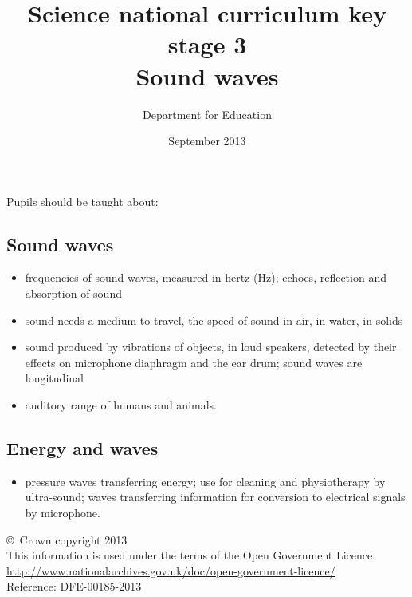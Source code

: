 \documentclass[a4paper,12pt]{article}
\begin{document}
\setcounter{secnumdepth}{0}

\title{Science national curriculum key stage 3\\Sound waves}
\author{Department for Education}
\date{September 2013}
\maketitle

\thispagestyle{empty}

Pupils should be taught about:

\subsection{Sound waves}
\begin{itemize}
\item frequencies of sound waves, measured in hertz (Hz); echoes, reflection and absorption
of sound
\item sound needs a medium to travel, the speed of sound in air, in water, in solids
\item sound produced by vibrations of objects, in loud speakers, detected by their effects on
microphone diaphragm and the ear drum; sound waves are longitudinal
\item auditory range of humans and animals.
\end{itemize}

\subsection{Energy and waves}
\begin{itemize}
\item pressure waves transferring energy; use for cleaning and physiotherapy by ultra-sound;
waves transferring information for conversion to electrical signals by microphone.
\end{itemize}

\vfill

\footnotesize
\noindent \copyright\ Crown copyright 2013\\
This information is used under the terms of the Open Government Licence\\
\url{http://www.nationalarchives.gov.uk/doc/open-government-licence/}\\
{\tiny Reference: DFE-00185-2013}
\end{document}
